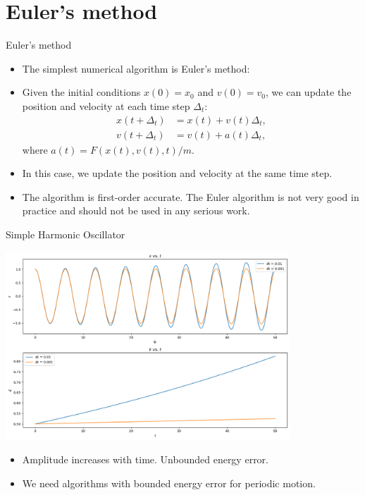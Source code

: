 \documentclass{beamer}
\begin{document}
\section{Euler's method}
\begin{frame}{Euler's method}
  \begin{itemize}
    \item The simplest numerical algorithm is Euler's method:
    \item Given the initial conditions $x(0)=x_0$ and $v(0)=v_0$, we can update the position and velocity at each time step $\Delta_t$:
    \begin{align*}
      x(t+\Delta_t) &= x(t)+v(t)\Delta_t,\\
      v(t+\Delta_t) &= v(t)+a(t)\Delta_t,
    \end{align*}
    where $a(t)=F(x(t),v(t),t)/m$.
    \item In this case, we update the position and velocity at the same time step.
    \item The algorithm is first-order accurate. The Euler algorithm is not very good in practice and  should not be used in any serious work.
  \end{itemize}
\end{frame}
\begin{frame}{Simple Harmonic Oscillator}
\centerline{\includegraphics[width=0.8\textwidth]{./eulercmp.png}}
\begin{itemize}
  \item Amplitude increases with time. Unbounded energy error.
  \item We need algorithms with bounded energy error for periodic motion.
\end{itemize}
\end{frame}
\end{document}
